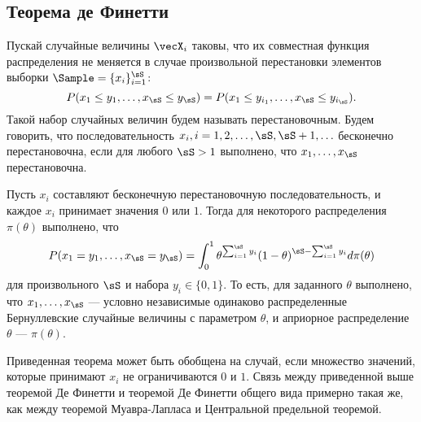 \subsection{Теорема де Финетти}

Пускай случайные величины $\vecX_i$ таковы, что их совместная функция распределения не меняется  в случае произвольной перестановки элементов выборки $\Sample = \{x_i\}_{i = 1}^{\sS}$:
\[
P(x_1 \leq y_1, \ldots, x_{\sS} \leq y_{\sS}) = P(x_1 \leq y_{i_1}, \ldots, x_{\sS} \leq y_{i_\sS}).
\]
Такой набор случайных величин будем называть перестановочным.
Будем говорить, что последовательность $x_i, i = 1, 2, \ldots, \sS, \sS + 1, \ldots$ бесконечно перестановочна, если для любого $\sS > 1$ выполнено, что $x_1, \ldots, x_{\sS}$ перестановочна.

\begin{Theorem}
Пусть $x_i$ составляют бесконечную перестановочную последовательность, и каждое $x_i$ принимает значения $0$ или $1$. 
Тогда для некоторого распределения $\pi(\theta)$ выполнено, что
\[
P(x_1 = y_1, \ldots, x_{\sS} = y_{\sS}) = \int_{0}^1 \theta^{\sum_{i = 1}^{\sS} y_i} (1 - \theta)^{\sS - \sum_{i = 1}^{\sS} y_i} d \pi(\theta)
\]
для произвольного $\sS$ и набора $y_i \in \{0, 1\}$.
То есть, для заданного $\theta$ выполнено, что $x_1, \ldots, x_{\sS}$ --- условно независимые одинаково распределенные Бернуллевские случайные величины  с параметром $\theta$, и априорное распределение $\theta$ --- $\pi(\theta)$.
\end{Theorem}

Приведенная теорема может быть обобщена на случай, если множество значений, которые принимают $x_i$ не ограничиваются $0$ и $1$.
Связь между приведенной выше теоремой Де Финетти и теоремой Де Финетти общего вида примерно такая же, как между теоремой Муавра-Лапласа и Центральной предельной теоремой.

